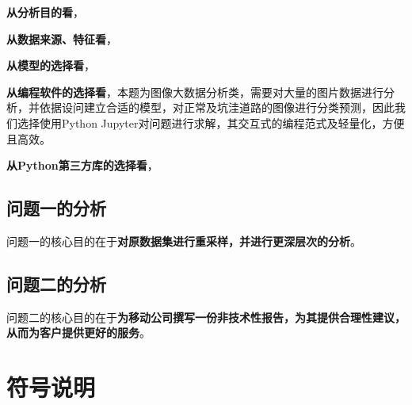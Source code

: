 \documentclass{MathorCupmodeling}
\begin{document}
	\textbf{从分析目的看}，

	\textbf{从数据来源、特征看}，
	
	\textbf{从模型的选择看}，

	\textbf{从编程软件的选择看}，本题为图像大数据分析类，需要对大量的图片数据进行分析，并依据设问建立合适的模型，对正常及坑洼道路的图像进行分类预测，因此我们选择使用Python Jupyter对问题进行求解，其交互式的编程范式及轻量化，方便且高效。

	\textbf{从Python第三方库的选择看}，

	\subsection{问题一的分析}
	问题一的核心目的在于\textbf{对原数据集进行重采样，并进行更深层次的分析}。
	\subsection{问题二的分析}
	问题二的核心目的在于\textbf{为移动公司撰写一份非技术性报告，为其提供合理性建议，从而为客户提供更好的服务}。
	\section{符号说明}
	\begin{center}
	\end{center}
\end{document}
